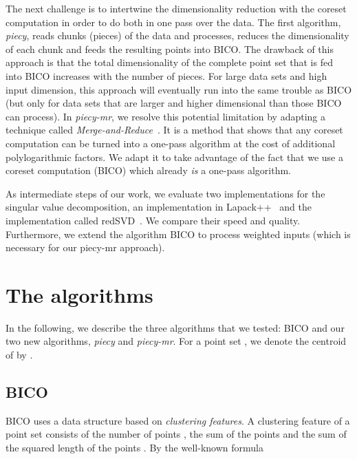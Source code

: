 \documentclass[a4paper]{scrartcl}
\begin{document}
The next challenge is to intertwine the dimensionality reduction with the coreset computation in order to do both in one pass over the data. The first algorithm, \emph{piecy}, reads chunks (pieces) of the data and processes, reduces the dimensionality of each chunk and feeds the resulting points into BICO. The drawback of this approach is that the total dimensionality of the complete point set that is fed into BICO increases with the number of pieces. For large data sets and high input dimension, this approach will eventually run into the same trouble as BICO (but only for data sets that are larger and higher dimensional than those BICO can process).
In \emph{piecy-mr}, we resolve this potential limitation by adapting a technique called \emph{Merge-and-Reduce}~\cite{HPM04}. It is a method that shows that any coreset computation can be turned into a one-pass algorithm at the cost of additional polylogarithmic factors. We adapt it to take advantage of the fact that we use a coreset computation (BICO) which already \emph{is} a one-pass algorithm.

As intermediate steps of our work, we evaluate two implementations for the singular value decomposition, an implementation in Lapack++~\cite{LL10} and the implementation called redSVD~\cite{O11}. We compare their speed and quality. Furthermore, we extend the algorithm BICO to process weighted inputs (which is necessary for our piecy-mr approach).

\section{The algorithms}\label{sec:the-algorithms}
In the following, we describe the three algorithms that we tested: BICO and our two new algorithms, \emph{piecy} and \emph{piecy-mr}. For a point set , we denote the centroid of  by .

\subsection{BICO}
BICO uses a data structure based on \emph{clustering features}. A clustering feature of a point set  consists of the number of points , the sum of the points  and the sum of the squared length of the points . By the well-known formula
\end{document}
